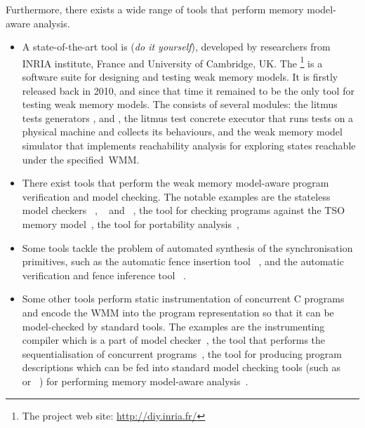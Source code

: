 Furthermore, there exists a wide range of tools that perform memory model-aware analysis.
\begin{itemize}[noitemsep,topsep=0pt]

\item A state-of-the-art tool is  (\textit{do it yourself}), developed by researchers from INRIA institute, France and University of Cambridge, UK.
The %
%
\footnote{The  project web site: \url{http://diy.inria.fr/}} %
%
is a software suite for designing and testing weak memory models.
It is firstly released back in 2010, and since that time it remained to be the only tool for testing weak memory models.
The  consists of several modules:
the litmus tests generators ,  and ,
the litmus test concrete executor  that runs tests on a physical machine and collects its behaviours,
and the weak memory model simulator  that implements reachability analysis for exploring states reachable under the specified~WMM.

\item There exist tools that perform the weak memory model-aware program verification and model checking.
The notable examples are
the stateless model checkers ~\cite{kokologiannakis2017effective}, ~\cite{musuvathi2008fair} and ~\cite{abdulla2017stateless},
the tool  for checking programs against the TSO memory model~\cite{bouajjani2013checking}, 
the tool \porthos{} for portability analysis~\cite{Porthos17a},

\item Some tools tackle the problem of automated synthesis of the synchronisation primitives, such as
the automatic fence insertion tool ~\cite{alglave2014don}, and
the automatic verification and fence inference tool ~\cite{kuperstein2011partial}.

\item Some other tools perform static instrumentation of concurrent C programs and encode the WMM into the program representation so that it can be model-checked by standard tools.
The examples are
the instrumenting compiler  which is a part of  model checker~\cite{kroening2014cbmc},
the tool that performs the sequentialisation of concurrent programs~\cite{alglave2013software},
the tool  for producing program descriptions which can be fed into standard model checking tools (such as ~\cite{holzmann1997model} or ~\cite{cimatti2000nusmv}) for performing memory model-aware analysis~\cite{travkin2016verification}.
\end{itemize}

